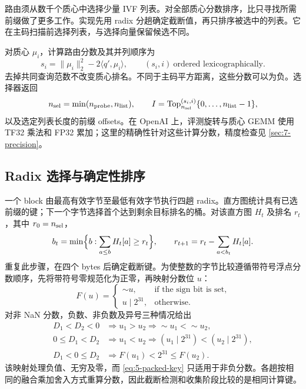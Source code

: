 路由须从数千个质心中选择少量 IVF 列表。对全部质心分数排序，比只寻找所需前缀做了更多工作。实现先用 radix 分趟确定截断值，再只排序被选中的列表。它在主码扫描前选择列表，与选择向量保留候选不同。

对质心 $\mu_i$，计算路由分数及其并列顺序为
\begin{equation}
 s_i=\|\mu_i\|_2^2-2\langle q',\mu_i\rangle,
 \qquad (s_i,i)\ \text{ordered lexicographically}.
 \label{eq:5-probe-score}
\end{equation}
去掉共同查询范数不改变质心排名。不同于主码平方距离，这些分数可以为负。选择器返回
\[
 n_{\rm sel}=\min(n_{\rm probe},n_{\rm list}),\qquad
 I=\operatorname{Top}^{(s_i,i)}_{n_{\rm sel}}\{0,\ldots,n_{\rm list}-1\},
\]
以及选定列表长度的前缀 offsets。在 OpenAI 上，评测旋转与质心 GEMM 使用 TF32 乘法和 FP32 累加；这里的精确性针对这些计算分数，精度检查见 \cref{sec:7-precision}。

\subsection{Radix 选择与确定性排序}

一个 block 由最高有效字节至最低有效字节执行四趟 radix。直方图统计具有已选前缀的键；下一个字节选择首个达到剩余目标排名的桶。对该直方图 $H_t$ 及排名 $r_t$，其中 $r_0=n_{\rm sel}$，
\[
 b_t=\min\Bigl\{b:\sum_{a\leq b}H_t[a]\geq r_t\Bigr\},\qquad
 r_{t+1}=r_t-\sum_{a<b_t}H_t[a].
\]
重复此步骤，在四个 bytes 后确定截断键。为使整数的字节比较遵循带符号浮点分数顺序，先将带符号零规范化为正零，再映射分数位 $u$：
\begin{equation}
 F(u)=\begin{cases}
       \mathop{\sim}u,&\text{if the sign bit is set},\\
       u\mathbin{|}2^{31},&\text{otherwise}.
      \end{cases}
 \label{eq:5-probe-key}
\end{equation}
对非 NaN 分数，负数、非负数及异号三种情况给出
\[
 \begin{aligned}
 D_1<D_2<0&\Rightarrow u_1>u_2\Rightarrow{\sim}u_1<{\sim}u_2,\\
 0\leq D_1<D_2&\Rightarrow u_1<u_2\Rightarrow
 (u_1\mathbin{|}2^{31})<(u_2\mathbin{|}2^{31}),\\
 D_1<0\leq D_2&\Rightarrow F(u_1)<2^{31}\leq F(u_2).
 \end{aligned}
\]
该映射处理负值、无穷及零，而 \cref{eq:5-packed-key} 只适用于非负分数。各趟按相同的融合乘加舍入方式重算分数，因此截断检测和收集阶段比较的是相同计算键。

